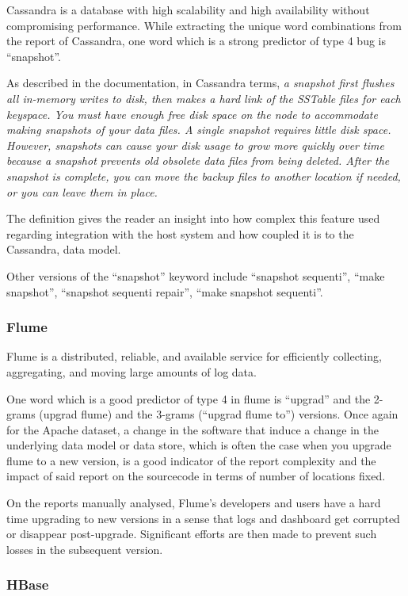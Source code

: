 \documentclass[12pt]{report}
\begin{document}
Cassandra is a database with high scalability and high availability
without compromising performance. While extracting the unique word
combinations from the report of Cassandra, one word which is a strong
predictor of type 4 bug is ``snapshot''.

As described in the documentation, in Cassandra terms, \emph{a snapshot
first flushes all in-memory writes to disk, then makes a hard link of
the SSTable files for each keyspace. You must have enough free disk
space on the node to accommodate making snapshots of your data files. A
single snapshot requires little disk space. However, snapshots can cause
your disk usage to grow more quickly over time because a snapshot
prevents old obsolete data files from being deleted. After the snapshot
is complete, you can move the backup files to another location if
needed, or you can leave them in place.}

The definition gives the reader an insight into how complex this feature
used regarding integration with the host system and how coupled it is to
the Cassandra, data model.

Other versions of the ``snapshot'' keyword include ``snapshot
sequenti'', ``make snapshot'', ``snapshot sequenti repair'', ``make
snapshot sequenti''.

\subsubsection{Flume}\label{flume}

Flume is a distributed, reliable, and available service for efficiently
collecting, aggregating, and moving large amounts of log data.

One word which is a good predictor of type 4 in flume is ``upgrad'' and
the 2-grams (upgrad flume) and the 3-grams (``upgrad flume to'')
versions. Once again for the Apache dataset, a change in the software
that induce a change in the underlying data model or data store, which
is often the case when you upgrade flume to a new version, is a good
indicator of the report complexity and the impact of said report on the
sourcecode in terms of number of locations fixed.

On the reports manually analysed, Flume's developers and users have a
hard time upgrading to new versions in a sense that logs and dashboard
get corrupted or disappear post-upgrade. Significant efforts are then
made to prevent such losses in the subsequent version.

\subsubsection{HBase}\label{hbase}
\end{document}
